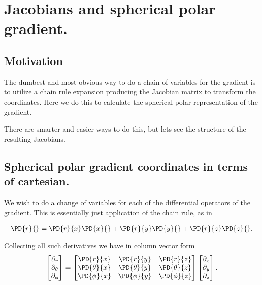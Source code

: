 

\chapter{Jacobians and spherical polar gradient.}
\label{chap:jacobianSphericalPolar}
{}
\date{Dec 6, 2009}

\beginArtWithToc

\section{Motivation}

The dumbest and most obvious way to do a chain of variables for the gradient is to utilize a chain rule expansion producing the Jacobian matrix to transform the coordinates.  Here we do this to calculate the spherical polar representation of the gradient.

There are smarter and easier ways to do this, but lets see the structure of the resulting Jacobians.

\section{Spherical polar gradient coordinates in terms of cartesian.}

We wish to do a change of variables for each of the differential operators of the gradient.  This is essentially just application of the chain rule, as in

\begin{align}\label{eqn:jacobianSphericalPolar:1}
\PD{r}{} 
= 
\PD{r}{x} \PD{x}{}
+\PD{r}{y} \PD{y}{}
+\PD{r}{z} \PD{z}{}.
\end{align}

Collecting all such derivatives we have in column vector form 
\begin{align}\label{eqn:jacobianSphericalPolar:2}
\begin{bmatrix}
\partial_r \\
\partial_\theta \\
\partial_\phi
\end{bmatrix}
= 
\begin{bmatrix}
\PD{r}{x} &\PD{r}{y} &\PD{r}{z}  \\
\PD{\theta}{x} &\PD{\theta}{y} &\PD{\theta}{z}  \\
\PD{\phi}{x} &\PD{\phi}{y} &\PD{\phi}{z} 
\end{bmatrix}
\begin{bmatrix}
\partial_x \\
\partial_y \\
\partial_z
\end{bmatrix}.
\end{align}


